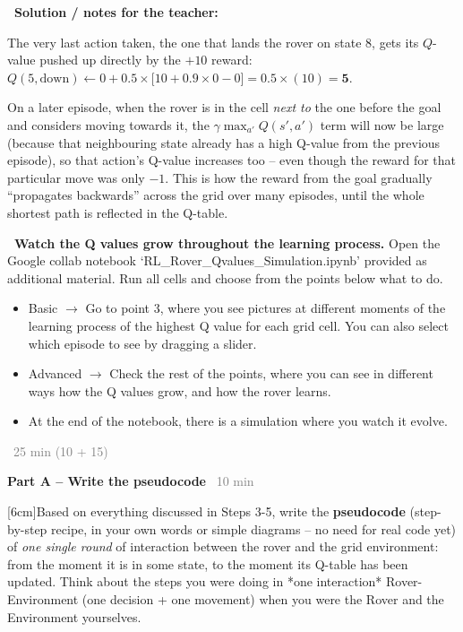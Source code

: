 \documentclass[12pt]{article}
\makeatletter
\newcounter{exercise}
\newcommand{\exercisetitle}[2][]{%
  \refstepcounter{exercise}%
  \vspace{0.5cm}%
  \colorbox{maincolor}{%
    \makebox[\dimexpr\linewidth-2\fboxsep][l]{%
      \textcolor{white}{\faPen\ Assignment \theexercise:~ #2}%
    }%
  }%
  \if\relax\detokenize{#1}\relax\else\label{#1}\fi
  \vspace{0.3cm}%
}
\newcounter{question}
\newlength\questionheight
\newcommand{\question}{\@ifstar{\question@text}{\question@field}}
\newcommand{\question@heading}[1]{%
  \refstepcounter{question}%
  \vspace{0.3cm}%
  \noindent\textbf{\faEdit\ Question \thequestion: #1}%
}
\newcommand{\question@text}[1]{%
  \question@heading{#1}%
}
\newcommand{\question@field}[2][\questionheight]{%
  \question@heading{#2}%
 \\[0.3em] \begin{Form}
    \TextField[
      name=Q\thequestion,
      multiline=true,
      width=\linewidth,
      height=#1,
      charsize=10pt,
      bordercolor={0 0 0},
      borderwidth=1.8,
      backgroundcolor={1 1 1}
    ]{}
  \end{Form}
  \vspace{0.3cm}%
}
\newenvironment{solution}{%
  \begin{solutionbox}\textbf{\faChalkboardTeacher\ Solution / notes for the teacher:}
}{%
  \end{solutionbox}
}
\makeatother
\begin{document}
\begin{solution}
The very last action taken, the one that lands the rover on state 8, gets its $Q$-value pushed up directly by the $+10$ reward: $Q(5,\text{down}) \leftarrow 0 + 0.5 \times \big[10 + 0.9\times 0 - 0\big] = 0.5\times(10) = \mathbf{5}$.

On a later episode, when the rover is in the cell \emph{next to} the one before the goal and considers moving towards it, the $\gamma \max_{a'}Q(s',a')$ term will now be large (because that neighbouring state already has a high Q-value from the previous episode), so that action's Q-value increases too -- even though the reward for that particular move was only $-1$. This is how the reward from the goal gradually ``propagates backwards'' across the grid over many episodes, until the whole shortest path is reflected in the Q-table.
\end{solution}

\textcolor{maincolor}{\textbf{\faPen\ Watch the Q values grow throughout the learning process.}} Open the Google collab notebook `RL\_Rover\_Qvalues\_Simulation.ipynb' provided as additional material. Run all cells and choose from the points below what to do.

\begin{itemize}
  \item Basic $\rightarrow$ Go to point 3, where you see pictures at different moments of the learning process of the highest Q value for each grid cell. You can also select which episode to see by dragging a slider. 
  \item Advanced $\rightarrow$ Check the rest of the points, where you can see in different ways how the Q values grow, and how the rover learns.
  \item At the end of the notebook, there is a simulation where you watch it evolve.
\end{itemize}





\exercisetitle{Program the rover's brain}\label{ass:pseudocode}
\textcolor{gray}{\faClock\ 25 min (10 + 15)}

\vspace{0.2cm}
\textbf{Part A -- Write the pseudocode} \textcolor{gray}{\faClock\ 10 min}

\question[6cm]{Based on everything discussed in Steps 3-5, write the \textbf{pseudocode} (step-by-step recipe, in your own words or simple diagrams -- no need for real code yet) of \emph{one single round} of interaction between the rover and the grid environment: from the moment it is in some state, to the moment its Q-table has been updated. Think about the steps you were doing in *one interaction* Rover-Environment (one decision + one movement) when you were the Rover and the Environment yourselves.}
\end{document}
